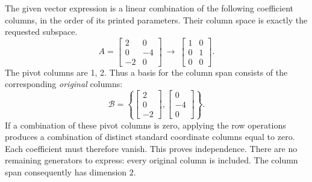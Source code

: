 The given vector expression is a linear combination of the following coefficient columns, in the order of its printed parameters. Their column space is exactly the requested subspace.
\[A=\left[\begin{array}{rr}2&0\\0&-4\\-2&0\end{array}\right]\ \longrightarrow\ \left[\begin{array}{rr}1&0\\0&1\\0&0\end{array}\right].\]
The pivot columns are 1, 2. Thus a basis for the column span consists of the corresponding \emph{original} columns:
\[\mathcal B=\left\{\left[\begin{array}{r}2\\0\\-2\end{array}\right],\left[\begin{array}{r}0\\-4\\0\end{array}\right]\right\}.\]
If a combination of these pivot columns is zero, applying the row operations produces a combination of distinct standard coordinate columns equal to zero. Each coefficient must therefore vanish. This proves independence. There are no remaining generators to express: every original column is included. The column span consequently has dimension $2$.

